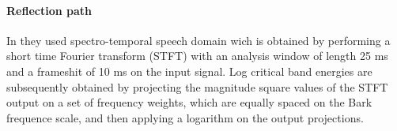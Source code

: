 \documentclass[a4paper,10pt]{article}
\begin{document}
\paragraph{Reflection path} In \cite{DL_speech_reco} they used spectro-temporal speech domain wich is obtained by performing a short time Fourier transform (STFT) with an analysis window of length 25 ms and a frameshit of 10 ms on the input signal. Log critical band energies are subsequently obtained by projecting the magnitude square values of the STFT output on a set of frequency weights, which are equally spaced on the Bark frequence scale, and then applying a logarithm on the output projections.


\end{document}
